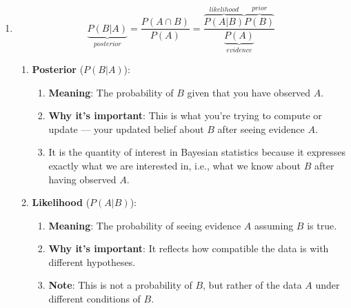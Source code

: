 \begin{enumerate}
    \item
    \begin{theorem}
        \[
            \underset{posterior}{\underbrace{P(B|A)}}
            = \dfrac{P(A\cap B)}{P(A)} 
            = \dfrac{
                \overset{likelihood}{\overbrace{P(A|B)}}
                \overset{prior}{\overbrace{P(B)}}
            }{
                \underset{evidence}{\underbrace{P(A)}}
            }
        \]
        \hfill \cite{statistics/book/Statistics-for-Data-Scientists/Maurits-Kaptein,mfml/book/mml/Deisenroth-Faisal-Ong}
    \end{theorem}
    \begin{enumerate}
        \item \textbf{Posterior} ($P(B|A)$):
        \begin{enumerate}
            \item \textbf{Meaning}: The probability of $B$ given that you have observed $A$.
            \hfill \cite{common/online/chatgpt}

            \item \textbf{Why it's important}: This is what you’re trying to compute or update — your updated belief about $B$ after seeing evidence $A$.
            \hfill \cite{common/online/chatgpt}

            \item It is the quantity of interest in Bayesian statistics because it expresses exactly what we are interested in, i.e., what we know about $B$ after having observed $A$.
            \hfill\cite{mfml/book/mml/Deisenroth-Faisal-Ong}
        \end{enumerate}

        \item \textbf{Likelihood} ($P(A|B)$):
        \begin{enumerate}
            \item \textbf{Meaning}: The probability of seeing evidence $A$ assuming $B$ is true.
            \hfill \cite{common/online/chatgpt}

            \item \textbf{Why it's important}: It reflects how compatible the data is with different hypotheses.
            \hfill \cite{common/online/chatgpt}

            \item \textbf{Note}: This is not a probability of $B$, but rather of the data $A$ under different conditions of $B$.
            \hfill \cite{common/online/chatgpt}


\end{enumerate}
\end{enumerate}
\end{enumerate}
